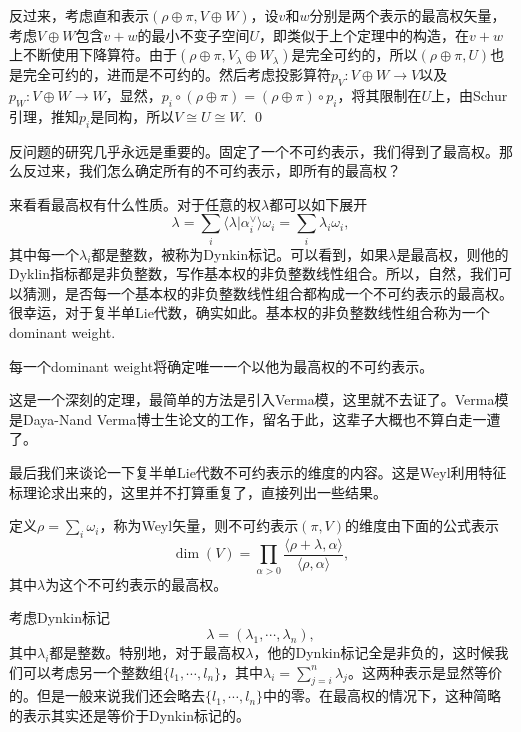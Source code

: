 \documentclass[9pt]{extarticle}
\begin{document}
反过来，考虑直和表示$(\rho\oplus\pi,V\oplus W)$，设$v$和$w$分别是两个表示的最高权矢量，考虑$V\oplus W$包含$v+w$的最小不变子空间$U$，即类似于上个定理中的构造，在$v+w$上不断使用下降算符。由于$(\rho\oplus\pi,V_\lambda\oplus W_\lambda)$是完全可约的，所以$(\rho\oplus\pi,U)$也是完全可约的，进而是不可约的。然后考虑投影算符$p_V:V\oplus W\to V$以及$p_W:V\oplus W\to W$，显然，$p_i\circ (\rho\oplus\pi)=(\rho\oplus\pi)\circ p_i$，将其限制在$U$上，由Schur引理，推知$p_i$是同构，所以$V\cong U\cong W$. \qed

\para 反问题的研究几乎永远是重要的。固定了一个不可约表示，我们得到了最高权。那么反过来，我们怎么确定所有的不可约表示，即所有的最高权？

来看看最高权有什么性质。对于任意的权$\lambda$都可以如下展开
\[
	\lambda=\sum_i \langle \lambda|\alpha_i^\vee\rangle \omega_i=\sum_i \lambda_i \omega_i,
\]
其中每一个$\lambda_i$都是整数，被称为Dynkin标记。可以看到，如果$\lambda$是最高权，则他的Dyklin指标都是非负整数，写作基本权的非负整数线性组合。所以，自然，我们可以猜测，是否每一个基本权的非负整数线性组合都构成一个不可约表示的最高权。很幸运，对于复半单Lie代数，确实如此。基本权的非负整数线性组合称为一个dominant weight.



\theo 每一个dominant weight将确定唯一一个以他为最高权的不可约表示。

这是一个深刻的定理，最简单的方法是引入Verma模，这里就不去证了。Verma模是Daya-Nand Verma博士生论文的工作，留名于此，这辈子大概也不算白走一遭了。

\para 最后我们来谈论一下复半单Lie代数不可约表示的维度的内容。这是Weyl利用特征标理论求出来的，这里并不打算重复了，直接列出一些结果。

定义$\rho=\sum_i \omega_i$，称为Weyl矢量，则不可约表示$(\pi,V)$的维度由下面的公式表示
\[
	\dim(V)=\prod_{\alpha>0}\frac{\langle \rho+\lambda,\alpha\rangle}{\langle \rho,\alpha\rangle},
\]
其中$\lambda$为这个不可约表示的最高权。

\para 考虑Dynkin标记
\[
	\lambda=(\lambda_1,\cdots,\lambda_n),
\]
其中$\lambda_i$都是整数。特别地，对于最高权$\lambda$，他的Dynkin标记全是非负的，这时候我们可以考虑另一个整数组$\{l_1,\cdots,l_n\}$，其中$\lambda_i=\sum_{j=i}^n\lambda_j$。这两种表示是显然等价的。但是一般来说我们还会略去$\{l_1,\cdots,l_n\}$中的零。在最高权的情况下，这种简略的表示其实还是等价于Dynkin标记的。
\end{document}
